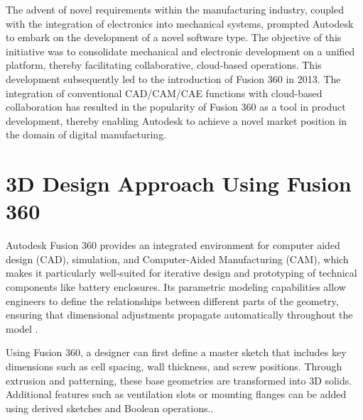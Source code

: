 The advent of novel requirements within the manufacturing industry, coupled with the integration of electronics into mechanical systems, prompted Autodesk to embark on the development of a novel software type. The objective of this initiative was to consolidate mechanical and electronic development on a unified platform, thereby facilitating collaborative, cloud-based operations. This development subsequently led to the introduction of Fusion 360 in 2013.\autocite{wikipedia_autodesk_deutsch}
The integration of conventional CAD/CAM/CAE functions with cloud-based collaboration has resulted in the popularity of Fusion 360 as a tool in product development, thereby enabling Autodesk to achieve a novel market position in the domain of digital manufacturing.


\section{3D Design Approach Using Fusion 360}
Autodesk Fusion 360 provides an integrated environment for computer aided design (CAD), simulation, and Computer-Aided Manufacturing (CAM), which makes it particularly well-suited for iterative design and prototyping of technical components like battery enclosures. Its parametric modeling capabilities allow engineers to define the relationships between different parts of the geometry, ensuring that dimensional adjustments propagate automatically throughout the model \cite{hogan2025}.

Using Fusion 360, a designer can first define a master sketch that includes key dimensions such as cell spacing, wall thickness, and screw positions. Through extrusion and patterning, these base geometries are transformed into 3D solids. Additional features such as ventilation slots or mounting flanges can be added using derived sketches and Boolean operations\cite{hogan2025}..


